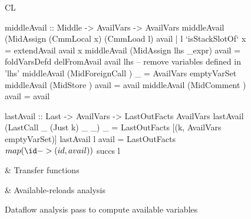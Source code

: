 \documentclass[blockstyle,preprint,nocopyrightspace]{sigplanconf}
\newcommand\figlabel[1]{\label{fig:#1}}
\begin{document}
\begin{figure*}
\begin{tabular}{CL}
\begin{code}
middleAvail :: Middle -> AvailVars -> AvailVars
middleAvail (MidAssign (CmmLocal x) (CmmLoad l) avail
                 | l `isStackSlotOf` x = extendAvail avail x
middleAvail (MidAssign lhs _expr) avail = 
  foldVarsDefd delFromAvail avail lhs  -- remove variables defined in 'lhs'
middleAvail (MidForeignCall {})   _    = AvailVars emptyVarSet
middleAvail (MidStore {})         avail = avail
middleAvail (MidComment {})       avail = avail

lastAvail :: Last -> AvailVars -> LastOutFacts AvailVars
lastAvail (LastCall _ (Just k) _ _) _ = LastOutFacts [(k, AvailVars emptyVarSet)]
lastAvail l avail = LastOutFacts $ map (\id -> (id, avail)) $ succs l
\end{code}\B
& Transfer \mbox{functions}\\
\hline

\T{}\B
& Available-reloads analysis\\

\end{tabular}
\caption{Dataflow analysis pass to compute available variables}
\figlabel{avail-all}
\figlabel{avail}
\figlabel{avail-lattice}
\figlabel{avail-gen-kill}
\figlabel{avail-transfers}
\figlabel{avail-running}
\end{figure*}
\end{document}
